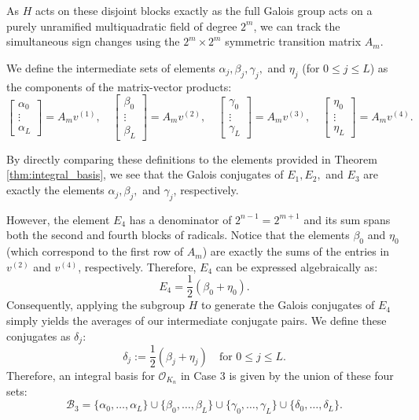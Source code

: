 \documentclass{amsart}
\theoremstyle{plain}
\theoremstyle{definition}
\theoremstyle{remark}
\numberwithin{equation}{section}
\begin{document}
As $H$ acts on these disjoint blocks exactly as the full Galois group acts on a purely unramified multiquadratic field of degree $2^m$, we can   track the simultaneous sign changes using the $2^m \times 2^m$ symmetric transition matrix $A_m$.

We define the intermediate sets of elements $\alpha_j, \beta_j, \gamma_j,$ and $\eta_j$ (for $0 \leq j \leq L$) as the components of the matrix-vector products:
\[
    \begin{bmatrix} \alpha_0 \\ \vdots \\ \alpha_L \end{bmatrix} = A_m v^{(1)}, \quad
    \begin{bmatrix} \beta_0 \\ \vdots \\ \beta_L \end{bmatrix} = A_m v^{(2)}, \quad
    \begin{bmatrix} \gamma_0 \\ \vdots \\ \gamma_L \end{bmatrix} = A_m v^{(3)}, \quad
    \begin{bmatrix} \eta_0 \\ \vdots \\ \eta_L \end{bmatrix} = A_m v^{(4)}.
\]

By directly comparing these definitions to the elements provided in Theorem \ref{thm:integral_basis}, we see that the Galois conjugates of $E_1, E_2,$ and $E_3$ are exactly the elements $\alpha_j, \beta_j,$ and $\gamma_j$, respectively. 

However, the element $E_4$ has a denominator of $2^{n-1} = 2^{m+1}$ and its sum spans both the second and fourth blocks of radicals. Notice that the elements $\beta_0$ and $\eta_0$ (which correspond to the first row of $A_m$) are exactly the sums of the entries in $v^{(2)}$ and $v^{(4)}$, respectively. Therefore, $E_4$ can be expressed algebraically as:$$    E_4 = \frac{1}{2} (\beta_0 + \eta_0).$$Consequently, applying the subgroup $H$ to generate the Galois conjugates of $E_4$ simply yields the averages of our intermediate conjugate pairs. We define these conjugates as $\delta_j$:
\[
    \delta_j := \frac{1}{2}(\beta_j + \eta_j) \quad \text{for } 0 \leq j \leq L.
\]
Therefore, an  integral basis for $\mathcal{O}_{K_n}$ in Case 3 is given by the union of these four sets:
\[
    \mathcal{B}_3 = \{\alpha_0, \ldots, \alpha_L\} \cup \{\beta_0, \ldots, \beta_L\} \cup \{\gamma_0, \ldots, \gamma_L\} \cup \{\delta_0, \ldots, \delta_L\}.
\]
\end{document}
